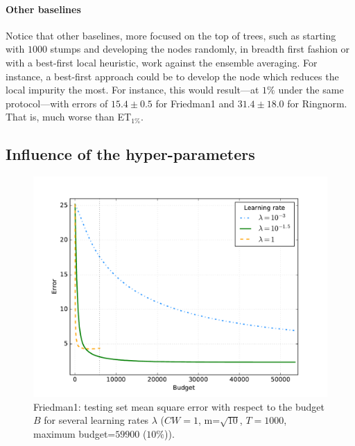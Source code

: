 \documentclass{article}
\begin{document}
\paragraph{Other baselines}
Notice that other baselines, more focused on the top of trees, such as starting 
with $1000$ stumps and developing the nodes randomly, in breadth first fashion 
or with a best-first local heuristic, work against the ensemble averaging. For 
instance, a best-first approach could be to develop the node which reduces the 
local impurity the most. For instance, this would result---at $1\%$ under the 
same protocol---with errors of $15.4 \pm 0.5$ for Friedman1 and $31.4 \pm 18.0$ 
for Ringnorm. That is, much worse than ET$_{1\%}$.

\subsection{Influence of the hyper-parameters}
\label{subsec:hyperparams}



\begin{figure}[ht]
\begin{center}
\centerline{\includegraphics[width=\columnwidth]{friedman1_lr_cw1}}
\caption{Friedman1: testing set mean square error with respect to the budget $B$
for several learning rates $\lambda$ ($CW=1$, m=$\sqrt{10}$, $T=1000$, maximum 
budget=$59900$ ($10\%$)).}
\label{fig:learningRate}
\end{center}
\vskip -0.2in
\end{figure} 
\end{document}
